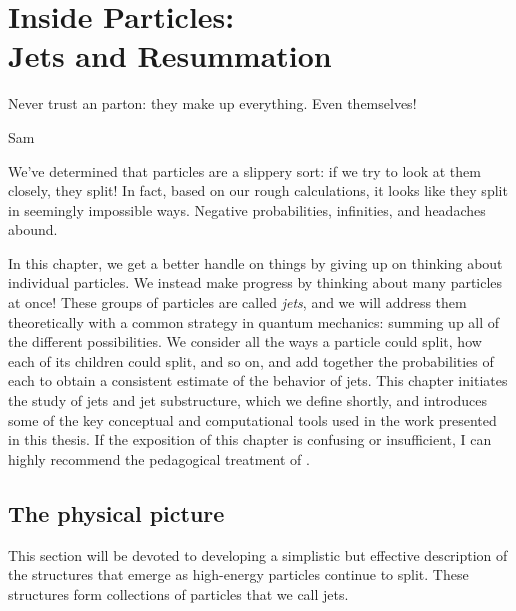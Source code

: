 \chapter[Inside Particles: Jets and Resummation]{Inside Particles:\\Jets and Resummation}
\label{chap:jets}

\epigraph{Never trust an parton: they make up everything. Even themselves!}{Sam}


We've determined that particles are a slippery sort:
%
if we try to look at them closely, they split!
%
In fact, based on our rough calculations, it looks like they split in seemingly impossible ways.
%
Negative probabilities, infinities, and headaches abound.

In this chapter, we get a better handle on things by giving up on thinking about individual particles.
%
We instead make progress by thinking about many particles at once!
%
These groups of particles are called \emph{jets}, and we will address them theoretically with a common strategy in quantum mechanics:
%
summing up all of the different possibilities.
%
We consider all the ways a particle could split, how each of its children could split, and so on, and add together the probabilities of each to obtain a consistent estimate of the behavior of jets.
%
This chapter initiates the study of jets and jet substructure, which we define shortly, and introduces some of the key conceptual and computational tools used in the work presented in this thesis.
%
If the exposition of this chapter is confusing or insufficient, I can highly recommend the pedagogical treatment of .



\section{The physical picture}

This section will be devoted to developing a simplistic but effective description of the structures that emerge as high-energy particles continue to split.
%
These structures form collections of particles that we call jets.

